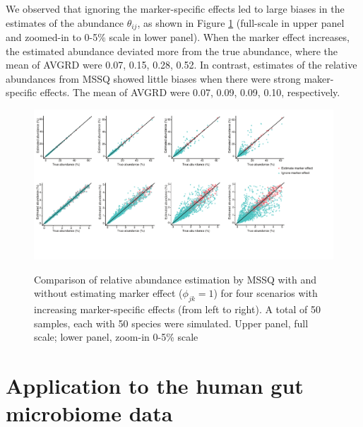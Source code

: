 We observed that ignoring the marker-specific effects led to large biases in  the estimates of the abundance $\theta_{ij}$, as shown in Figure \ref{F33_2016_02_07_Abundance_Estimation_Scale5_100_Merge} (full-scale in upper panel and zoomed-in to 0-5\% scale in lower panel). When the marker effect increases, the estimated abundance deviated more from the true abundance, where the mean of AVGRD were  0.07, 0.15, 0.28, 0.52.  In contrast, estimates of the relative abundances from MSSQ showed  little biases when there were strong maker-specific effects. The mean of AVGRD were 0.07, 0.09, 0.09, 0.10, respectively. 

\begin{figure}[ht]
	\centering
	{\includegraphics[scale=0.53,trim=0 60 20 0,clip]{Figure/F33_2016_02_07_Abundance_Estimation_Scale5_100_Merge.pdf}}
	\caption[Comparison of relative abundance estimation by MSSQ  with and without estimating marker effect]{Comparison of relative abundance estimation by MSSQ  with and without estimating marker effect ($\phi_{jk}=1$) for four scenarios with increasing marker-specific effects (from left to right). A total of 50 samples, each with 50 species were simulated. Upper panel, full scale; lower panel, zoom-in 0-5\% scale  }
	\label{F33_2016_02_07_Abundance_Estimation_Scale5_100_Merge}
\end{figure}



\section{Application to the human gut microbiome data}
\label{sec:realdata}

